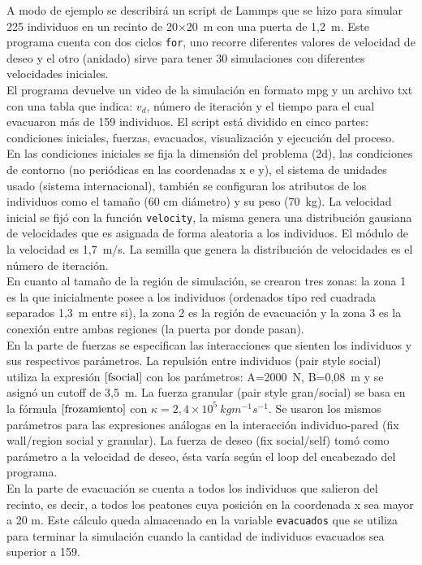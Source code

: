 A modo de ejemplo se describirá un script de Lammps que se hizo para simular 225 individuos en un recinto de 20$\times$20~m con una puerta de 1,2~m. Este programa cuenta con dos ciclos {\tt for}, uno recorre diferentes valores de velocidad de deseo y el otro (anidado) sirve para tener 30 simulaciones con diferentes velocidades iniciales. \\
El programa devuelve un video de la simulación en formato mpg y un archivo txt con una tabla que indica: $v_d$, número de iteración y el tiempo para el cual evacuaron más de 159 individuos.
El script está dividido en cinco partes: condiciones iniciales, fuerzas, evacuados, visualización y ejecución del proceso.\\ 
En las condiciones iniciales se fija la dimensión del problema (2d), las condiciones de contorno (no periódicas en las coordenadas x e y), el sistema de unidades usado (sistema internacional), también se configuran los atributos de los individuos como el tamaño (60 cm diámetro) y su peso (70~kg). La velocidad inicial se fijó con la función {\tt velocity}, la misma genera una distribución gausiana de velocidades que es asignada de forma aleatoria a los individuos. El módulo de la velocidad es 1,7~m/s. La semilla que genera la distribución de velocidades es el número de iteración.\\
En cuanto al tamaño de la región de simulación, se crearon tres zonas: la zona 1 es la que inicialmente posee a los individuos (ordenados tipo red cuadrada separados 1,3~m entre si), la zona 2 es la región de evacuación y la zona 3 es la conexión entre ambas regiones (la puerta por donde pasan).\\
En la parte de fuerzas se especifican las interacciones que sienten los individuos y sus respectivos parámetros. La repulsión entre individuos (pair style social) utiliza la expresión $\ref{fsocial}$ con los parámetros: A=2000~N, B=0,08~m y se asignó un cutoff de 3,5~m. La fuerza granular (pair style gran/social) se basa en la fórmula $\ref{frozamiento}$ con $\kappa =2,4 \times 10^5~kgm^{-1}s^{-1}$. Se usaron los mismos parámetros para las expresiones análogas en la interacción individuo-pared (fix wall/region social y granular). La fuerza de deseo (fix social/self) tomó como parámetro a la velocidad de deseo, ésta varía según el loop del encabezado del programa. \\
En la parte de evacuación se cuenta a todos los individuos que salieron del recinto, es decir, a todos los peatones cuya posición en la coordenada x sea mayor a 20 m. Este cálculo queda almacenado en la variable {\tt evacuados} que se utiliza para terminar la simulación cuando la cantidad de individuos evacuados sea superior a 159. \\
